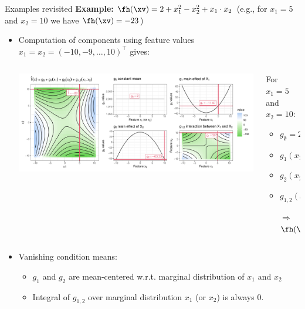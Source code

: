 \documentclass[10pt,compress,t,notes=noshow, xcolor=table]{beamer}
\newcommand{\open}{}
\newcommand{\close}{}
\begin{document}
\begin{frame}{Examples revisited}
\textbf{Example:} $\fh(\xv) = 2 + x_1^2 - x_2^2 + x_1 \cdot x_2$ (e.g., for $x_1 = 5$ and $x_2 = 10$ we have $\fh(\xv) = -23$)

\begin{itemize}
    \item Computation of components using feature values $x_1 = x_2 = (-10, -9, \ldots, 10)^\top$ gives:
    \begin{columns}[c, totalwidth=\linewidth]
    \begin{column}{0.75\textwidth}
        \includegraphics[width = \textwidth]{figure/decomposition}
    \end{column}
    \begin{column}{0.25\textwidth}
    For $x_1 = 5$ and $x_2 = 10$:\\
    \begin{itemize}
        \item $g_{\open \emptyset \close} = 2$
        \item $g_{\open 1 \close}(x_1) = -9.67$
        \item $g_{\open 2 \close}(x_2) = -65.33$
        \item $g_{\open 1,2 \close}(x_1, x_2) = 50$
        \item[$\Rightarrow$] $\fh(\xv) = -23$
    \end{itemize}
    \end{column}
    \end{columns}
    \item Vanishing condition means:
    \begin{itemize}
        \item $g_1$ and $g_2$ are mean-centered w.r.t. marginal distribution of $x_1$ and $x_2$
        \item Integral of $g_{1,2}$ over marginal distribution $x_1$ (or $x_2$) is always 0.
    \end{itemize}
\end{itemize} 
\end{frame}
\end{document}
